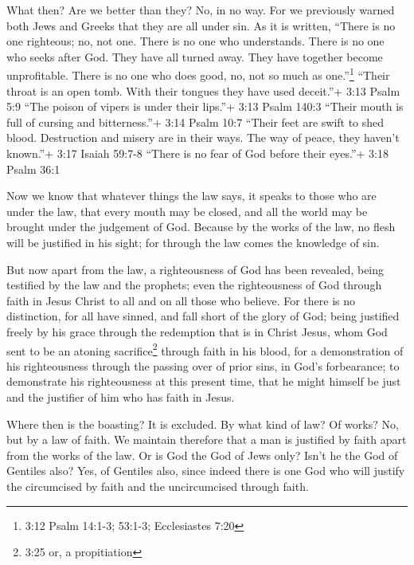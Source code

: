  What then? Are we better than they? No, in no way. For we
previously warned both Jews and Greeks that they are all under sin.
 As it is written, ``There is no one righteous; no, not
one.  There is no one who understands. There is no one who
seeks after God.  They have all turned away. They have
together become unprofitable. There is no one who does good, no, not so
much as one.''\footnote{3:12 Psalm 14:1-3; 53:1-3; Ecclesiastes 7:20}
 ``Their throat is an open tomb. With their tongues they
have used deceit.''+ 3:13 Psalm 5:9 ``The poison of vipers is under
their lips.''+ 3:13 Psalm 140:3  ``Their mouth is full of
cursing and bitterness.''+ 3:14 Psalm 10:7  ``Their feet
are swift to shed blood.  Destruction and misery are in
their ways.  The way of peace, they haven't known.''+ 3:17
Isaiah 59:7-8  ``There is no fear of God before their
eyes.''+ 3:18 Psalm 36:1

 Now we know that whatever things the law says, it speaks
to those who are under the law, that every mouth may be closed, and all
the world may be brought under the judgement of God. 
Because by the works of the law, no flesh will be justified in his
sight; for through the law comes the knowledge of sin.

 But now apart from the law, a righteousness of God has
been revealed, being testified by the law and the prophets;
 even the righteousness of God through faith in Jesus
Christ to all and on all those who believe. For there is no distinction,
 for all have sinned, and fall short of the glory of God;
 being justified freely by his grace through the redemption
that is in Christ Jesus,  whom God sent to be an atoning
sacrifice\footnote{3:25 or, a propitiation} through faith in his blood,
for a demonstration of his righteousness through the passing over of
prior sins, in God's forbearance;  to demonstrate his
righteousness at this present time, that he might himself be just and
the justifier of him who has faith in Jesus.

 Where then is the boasting? It is excluded. By what kind
of law? Of works? No, but by a law of faith.  We maintain
therefore that a man is justified by faith apart from the works of the
law.  Or is God the God of Jews only? Isn't he the God of
Gentiles also? Yes, of Gentiles also,  since indeed there
is one God who will justify the circumcised by faith and the
uncircumcised through faith.

